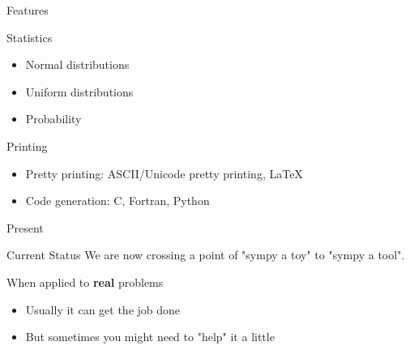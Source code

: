 \documentclass[xcolor=svgnames]{beamer}
\begin{document}
\begin{frame}{Features}
  \begin{block}{Statistics}
    \begin{itemize}
    \item Normal distributions
    \item Uniform distributions
    \item Probability
    \end{itemize}
  \end{block}
\end{frame}

\begin{frame}
  \begin{block}{Printing}
    \begin{itemize}
    \item Pretty printing: ASCII/Unicode pretty printing, LaTeX
    \item Code generation: C, Fortran, Python
    \end{itemize}
  \end{block}
\end{frame}

\begin{frame}{Present}
  \begin{block}{Current Status}
      We are now crossing a point of "sympy a toy" to "sympy a tool".
  \end{block}
  \pause
  \bigskip
  \begin{block}{When applied to \textbf{real} problems}
    \begin{itemize}
    \item Usually it can get the job done
    \item But sometimes you might need to "help" it a little
    \end{itemize}
  \end{block}
\end{frame}
\end{document}
